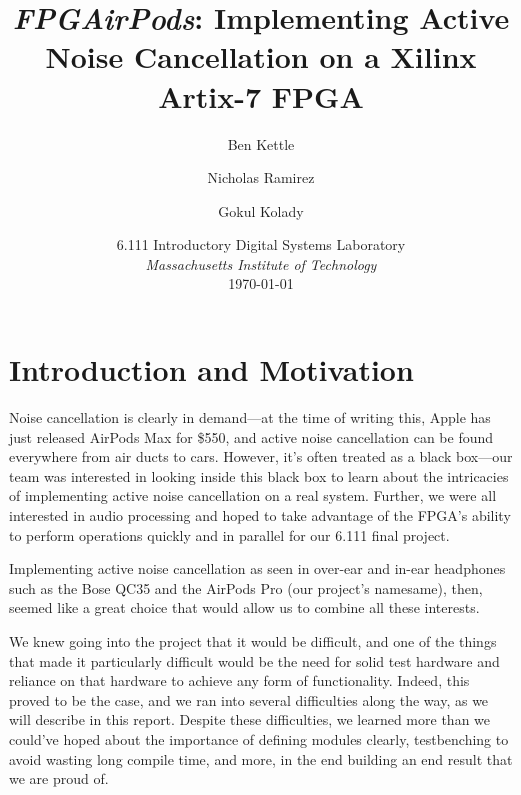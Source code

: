 \documentclass{fpgairpods}
\begin{document}
\title{\textit{FPGAirPods}: Implementing Active Noise Cancellation on a Xilinx Artix-7 FPGA}
\date{6.111 Introductory Digital Systems Laboratory \\ \textit{Massachusetts Institute of Technology} \\ \today}
\author{Ben Kettle \\  
\and Nicholas Ramirez \\  \and Gokul Kolady \\ }

\maketitle
\tableofcontents
\listoffigures

\newpage
\section{Introduction and Motivation}

Noise cancellation is clearly in demand---at the time of writing this, Apple has just released AirPods Max for \$550, and active noise cancellation can be found everywhere from air ducts to cars. However, it's often treated as a black box---our team was interested in looking inside this black box to learn about the intricacies of implementing active noise cancellation on a real system. Further, we were all interested in audio processing and hoped to take advantage of the FPGA's ability to perform operations quickly and in parallel for our 6.111 final project.

Implementing active noise cancellation as seen in over-ear and in-ear headphones such as the Bose QC35 and the AirPods Pro (our project's namesame), then, seemed like a great choice that would allow us to combine all these interests.

We knew going into the project that it would be difficult, and one of the things that made it particularly difficult would be the need for solid test hardware and reliance on that hardware to achieve any form of functionality. Indeed, this proved to be the case, and we ran into several difficulties along the way, as we will describe in this report. Despite these difficulties, we learned more than we could've hoped about the importance of defining modules clearly, testbenching to avoid wasting long compile time, and more, in the end building an end result that we are proud of.
\end{document}
